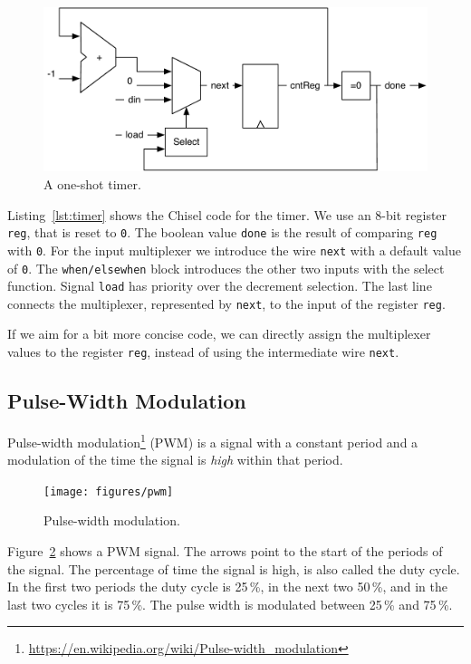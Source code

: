 \documentclass[%
    10pt,
    headinclude, footexclude,
    openright, %
    notitlepage,
    cleardoubleempty,
    headsepline,
    pointlessnumbers,
    bibtotoc, idxtotoc,
    ]{scrbook}
\newcommand{\code}[1]{{\small{\texttt{#1}}}}
\newcommand{\scale}{0.7}
\newcommand{\myref}[2]{\href{#1}{#2}}
\renewcommand{\myref}[2]{{#2}{\footnote{\url{#1}}}}
\begin{document}
\begin{figure}
  \centering
  \includegraphics[scale=\scale]{figures/timer}
  \caption{A one-shot timer.}
  \label{fig:timer}
\end{figure}

Listing~\ref{lst:timer} shows the Chisel code for the timer. We use an 8-bit register \code{reg},
that is reset to \code{0}. The boolean value \code{done} is the result of comparing \code{reg}
with \code{0}. For the input multiplexer we introduce the wire \code{next} with a default
value of \code{0}. The \code{when/elsewhen} block introduces the other two inputs with
the select function. Signal \code{load} has priority over the decrement selection.
The last line connects the multiplexer, represented by \code{next}, to the input of the
register \code{reg}.


If we aim for a bit more concise code, we can directly assign the multiplexer values to
the register \code{reg}, instead of using the intermediate wire \code{next}.

\subsection{Pulse-Width Modulation}

\myref{https://en.wikipedia.org/wiki/Pulse-width_modulation}{Pulse-width modulation} (PWM)
is a signal with a constant period and a modulation of the time the signal is \emph{high}
within that period.

\begin{figure}
  \centering
  \texttt{[image: figures/pwm]}
  \caption{Pulse-width modulation.}
  \label{fig:pwm}
\end{figure}

Figure~\ref{fig:pwm} shows a PWM signal. The arrows point to the start of the periods
of the signal. The percentage of time the signal is high, is also called the duty cycle.
In the first two periods the duty cycle is 25\,\%, in the next two 50\,\%, and in the last
two cycles it is 75\,\%. The pulse width is modulated between 25\,\% and 75\,\%.
\end{document}

